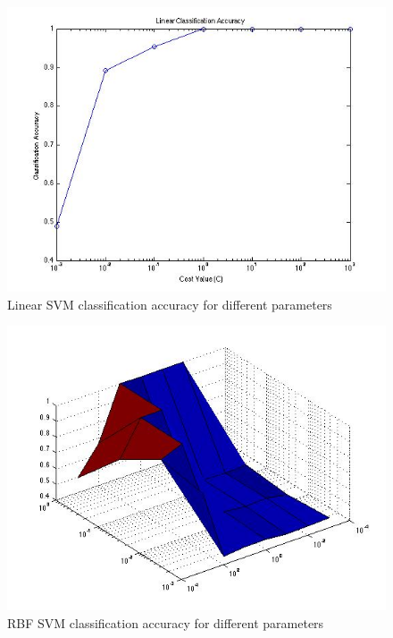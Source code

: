 \documentclass[paper=a4, fontsize=11pt]{scrartcl} %
\begin{document}
\begin{figure}
\centering
\includegraphics[scale=0.4]{linear.jpg}
\caption{Linear SVM classification accuracy for different parameters}
\label{fig:plot_2d}
\end{figure}

\begin{figure}
\centering
\includegraphics[scale=0.4]{RBF2.jpg}
\caption{RBF SVM classification accuracy for different parameters}
\label{fig:plot_2d}
\end{figure}
\end{document}
